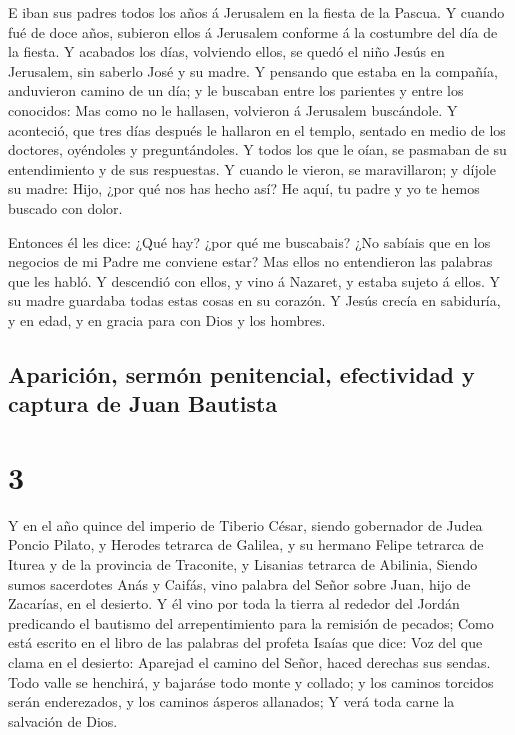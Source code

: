  E iban sus padres todos los años á Jerusalem en la
fiesta de la Pascua.  Y cuando fué de doce años, subieron
ellos á Jerusalem conforme á la costumbre del día de la fiesta.
 Y acabados los días, volviendo ellos, se quedó el niño
Jesús en Jerusalem, sin saberlo José y su madre.  Y
pensando que estaba en la compañía, anduvieron camino de un día; y le
buscaban entre los parientes y entre los conocidos:  Mas
como no le hallasen, volvieron á Jerusalem buscándole.  Y
aconteció, que tres días después le hallaron en el templo, sentado en
medio de los doctores, oyéndoles y preguntándoles.  Y
todos los que le oían, se pasmaban de su entendimiento y de sus
respuestas.  Y cuando le vieron, se maravillaron; y
díjole su madre: Hijo, ¿por qué nos has hecho así? He aquí, tu padre y
yo te hemos buscado con dolor.

 Entonces él les dice: ¿Qué hay? ¿por qué me buscabais?
¿No sabíais que en los negocios de mi Padre me conviene estar?
 Mas ellos no entendieron las palabras que les habló.
 Y descendió con ellos, y vino á Nazaret, y estaba sujeto
á ellos. Y su madre guardaba todas estas cosas en su corazón.
 Y Jesús crecía en sabiduría, y en edad, y en gracia para
con Dios y los hombres.

\hypertarget{apariciuxf3n-sermuxf3n-penitencial-efectividad-y-captura-de-juan-bautista}{%
\subsection{Aparición, sermón penitencial, efectividad y captura de Juan
Bautista}\label{apariciuxf3n-sermuxf3n-penitencial-efectividad-y-captura-de-juan-bautista}}

\hypertarget{section-2}{%
\section{3}\label{section-2}}

 Y en el año quince del imperio de Tiberio César, siendo
gobernador de Judea Poncio Pilato, y Herodes tetrarca de Galilea, y su
hermano Felipe tetrarca de Iturea y de la provincia de Traconite, y
Lisanias tetrarca de Abilinia,  Siendo sumos sacerdotes
Anás y Caifás, vino palabra del Señor sobre Juan, hijo de Zacarías, en
el desierto.  Y él vino por toda la tierra al rededor del
Jordán predicando el bautismo del arrepentimiento para la remisión de
pecados;  Como está escrito en el libro de las palabras
del profeta Isaías que dice: Voz del que clama en el desierto: Aparejad
el camino del Señor, haced derechas sus sendas.  Todo
valle se henchirá, y bajaráse todo monte y collado; y los caminos
torcidos serán enderezados, y los caminos ásperos allanados;
 Y verá toda carne la salvación de Dios.


